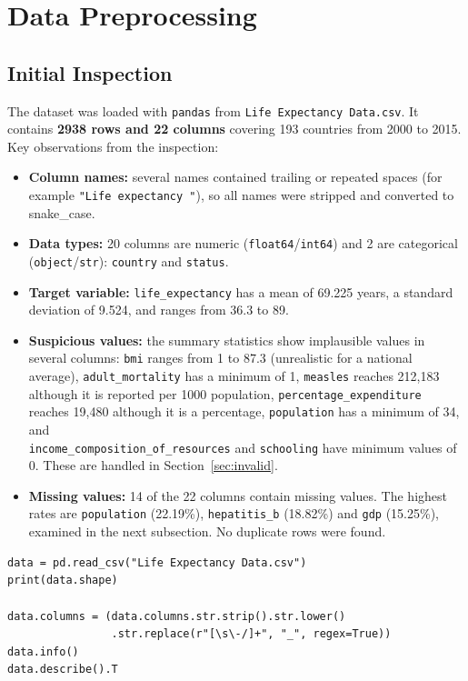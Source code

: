 \documentclass[12pt,a4paper]{article}
\begin{document}
\section{Data Preprocessing}
\subsection{Initial Inspection}
The dataset was loaded with \texttt{pandas} from \texttt{Life Expectancy Data.csv}.
It contains \textbf{2938 rows and 22 columns} covering 193 countries from 2000 to 2015.
Key observations from the inspection:
\begin{itemize}
  \item \textbf{Column names:} several names contained trailing or repeated
        spaces (for example \texttt{"Life expectancy "}), so all names were
        stripped and converted to snake\_case.
  \item \textbf{Data types:} 20 columns are numeric (\texttt{float64}/\texttt{int64}) and
        2 are categorical (\texttt{object}/\texttt{str}): \texttt{country} and \texttt{status}.
  \item \textbf{Target variable:} \texttt{life\_expectancy} has a mean of 69.225 years,
        a standard deviation of 9.524, and ranges from 36.3 to 89.
  \item \textbf{Suspicious values:} the summary statistics show implausible
        values in several columns: \texttt{bmi} ranges from 1 to 87.3 (unrealistic
        for a national average), \texttt{adult\_mortality} has a minimum of 1,
        \texttt{measles} reaches 212,183 although it is reported per 1000
        population, \texttt{percentage\_expenditure} reaches 19,480 although it is
        a percentage, \texttt{population} has a minimum of 34, and \\
        \texttt{income\_composition\_of\_resources} and \texttt{schooling} have
        minimum values of 0. These are handled in
        Section~\ref{sec:invalid}.
  \item \textbf{Missing values:} 14 of the 22 columns contain missing values.
        The highest rates are \texttt{population} (22.19\%),
        \texttt{hepatitis\_b} (18.82\%) and \texttt{gdp} (15.25\%), examined in
        the next subsection. No duplicate rows were found.
\end{itemize}

\begin{lstlisting}
data = pd.read_csv("Life Expectancy Data.csv")
print(data.shape)

data.columns = (data.columns.str.strip().str.lower()
                .str.replace(r"[\s\-/]+", "_", regex=True))
data.info()
data.describe().T
\end{lstlisting}
\end{document}
